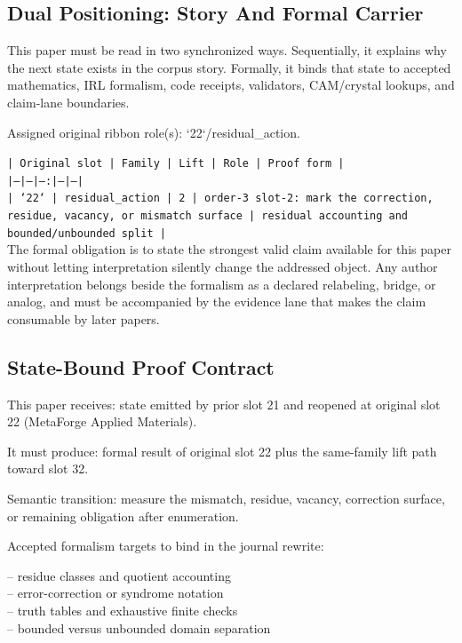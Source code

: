 \documentclass[11pt]{article}
\begin{document}
\subsection*{Dual Positioning: Story And Formal Carrier}

This paper must be read in two synchronized ways. Sequentially, it explains why
the next state exists in the corpus story. Formally, it binds that state to
accepted mathematics, IRL formalism, code receipts, validators, CAM/crystal
lookups, and claim-lane boundaries.

Assigned original ribbon role(s): `22`/residual\_action.

\noindent\texttt{| Original slot | Family | Lift | Role | Proof form |}\\
\noindent\texttt{|---|---|---:|---|---|}\\
\noindent\texttt{| `22` | residual\_action | 2 | order-3 slot-2: mark the correction, residue, vacancy, or mismatch surface | residual accounting and bounded/unbounded split |}\\

The formal obligation is to state the strongest valid claim available for this
paper without letting interpretation silently change the addressed object. Any
author interpretation belongs beside the formalism as a declared relabeling,
bridge, or analog, and must be accompanied by the evidence lane that makes the
claim consumable by later papers.

\subsection*{State-Bound Proof Contract}

This paper receives: state emitted by prior slot 21 and reopened at original slot 22 (MetaForge Applied Materials).

It must produce: formal result of original slot 22 plus the same-family lift path toward slot 32.

Semantic transition: measure the mismatch, residue, vacancy, correction surface, or remaining obligation after enumeration.

Accepted formalism targets to bind in the journal rewrite:

\noindent{}-- residue classes and quotient accounting\\
\noindent{}-- error-correction or syndrome notation\\
\noindent{}-- truth tables and exhaustive finite checks\\
\noindent{}-- bounded versus unbounded domain separation\\
\end{document}
